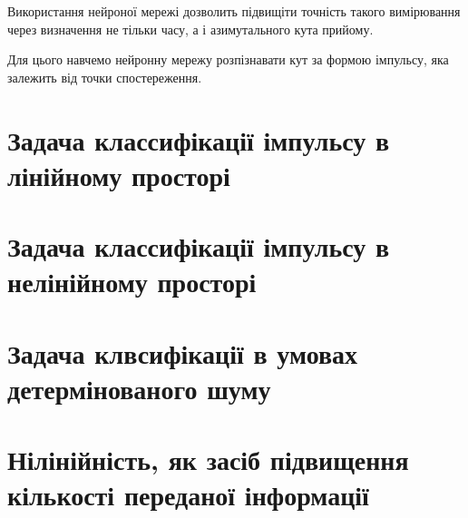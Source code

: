 Використання нейроної мережі дозволить підвищіти точність такого 
вимірювання через визначення не тільки часу, а і азимутального 
кута прийому.

Для цього навчемо нейронну мережу розпізнавати кут за формою 
імпульсу, яка залежить від точки спостереження.

\section{Задача классифікації імпульсу в лінійному просторі}

\section{Задача классифікації імпульсу в нелінійному просторі}

\section{Задача клвсифікації в умовах детермінованого шуму}

\section{Нілінійність, як засіб підвищення кількості переданої інформації}

